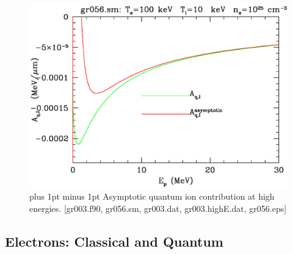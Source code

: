 \documentclass[preprint,12pt,eqsecnum,nofootinbib,amsmath,amssymb]{revtex4}
\newcommand{\footnoteskip}{\baselineskip 12pt plus 1pt minus 1pt}
\begin{document}
\vskip-2cm 
\begin{figure}[h!]
\includegraphics[scale=0.45]{gr056.eps} 
\vskip-0.8cm 
\caption{\footnoteskip  
  Asymptotic quantum ion contribution at high energies. [gr003.f90,
  gr056.sm, gr003.dat, gr003.highE.dat, gr056.eps]
}
\label{fig:gr056}
\end{figure}

\pagebreak
\subsection{Electrons: Classical and Quantum}
\end{document}

